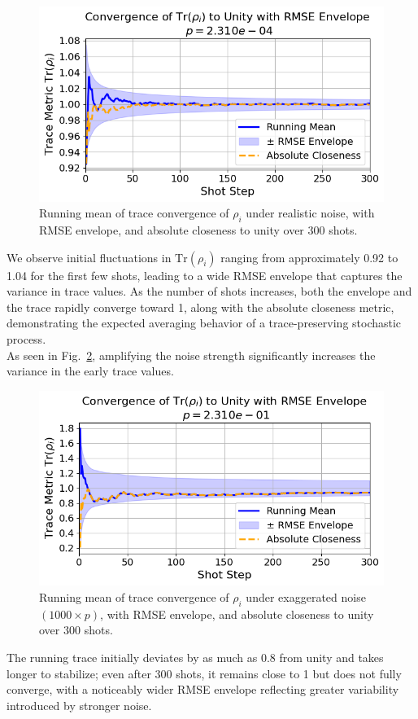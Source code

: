 \documentclass[9pt,a4paper,twocolumn,twoside]{tau-class/tau}
\begin{document}
\begin{figure}[H]
    \centering
        \includegraphics[width=1\linewidth]{figures/Trace_p_real_300.png}
        \caption{Running mean of trace convergence of \( \rho_i \) under realistic noise, with RMSE envelope, and absolute closeness to unity over 300 shots.}
    \label{fig:trace_convergence}
\end{figure}
We observe initial fluctuations in \( \mathrm{Tr}(\rho_i) \) ranging from approximately 0.92 to 1.04 for the first few shots, leading to a wide RMSE envelope that captures the variance in trace values. As the number of shots increases, both the envelope and the trace rapidly converge toward 1, along with the absolute closeness metric, demonstrating the expected averaging behavior of a trace-preserving stochastic process.\\
As seen in Fig.~\ref{fig:trace_convergence_worse}, amplifying the noise strength significantly increases the variance in the early trace values. 
\begin{figure}[H]
    \centering
        \includegraphics[width=1\linewidth]{figures/Trace_p_1000x_300.png}
    \caption{Running mean of trace convergence of \( \rho_i \) under exaggerated noise \((1000 \times p)\), with RMSE envelope, and absolute closeness to unity over 300 shots.}
    \label{fig:trace_convergence_worse}
\end{figure}
The running trace initially deviates by as much as 0.8 from unity and takes longer to stabilize; even after 300 shots, it remains close to 1 but does not fully converge, with a noticeably wider RMSE envelope reflecting greater variability introduced by stronger noise.
\end{document}

